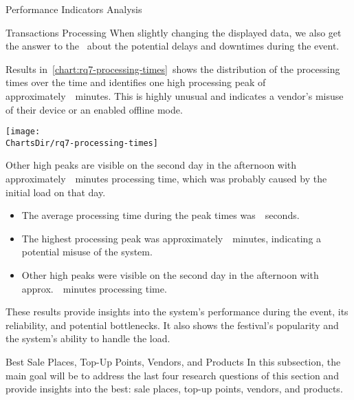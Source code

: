 \begin{section}{Performance Indicators Analysis}
\begin{subsection}{Transactions Processing}
		When slightly changing the displayed data, we also get the answer to the~ about the potential delays and downtimes during the event.


		Results in~\autoref{chart:rq7-processing-times}~shows the distribution of the processing times over the time and identifies one high processing peak of approximately~~minutes.
		This is highly unusual and indicates a vendor's misuse of their device or an enabled offline mode.

		\begin{chart}[h]
			\centering
			\texttt{[image: \\ChartsDir/rq7-processing-times]}
			\caption{ Transaction Processing Times}
			\label{chart:rq7-processing-times}
			\source
		\end{chart}

		Other high peaks are visible on the second day in the afternoon with approximately~~minutes processing time, which was probably caused by the initial load on that day.

		\begin{keytakeaways}
			\begin{itemize}
				\item The average processing time during the peak times was~~seconds.
				\item The highest processing peak was approximately~~minutes, indicating a potential misuse of the system.
				\item Other high peaks were visible on the second day in the afternoon with approx.~~minutes processing time.
			\end{itemize}
		\end{keytakeaways}

		These results provide insights into the system's performance during the event, its reliability, and potential bottlenecks.
		It also shows the festival's popularity and the system's ability to handle the load.

	\end{subsection}

	\begin{subsection}{Best Sale Places, Top-Up Points, Vendors, and Products}
		\label{subsec:analysis-performance-indicators-best}
		In this subsection, the main goal will be to address the last four research questions of this section and provide insights into the best: sale places, top-up points, vendors, and products.


\end{subsection}
\end{section}
